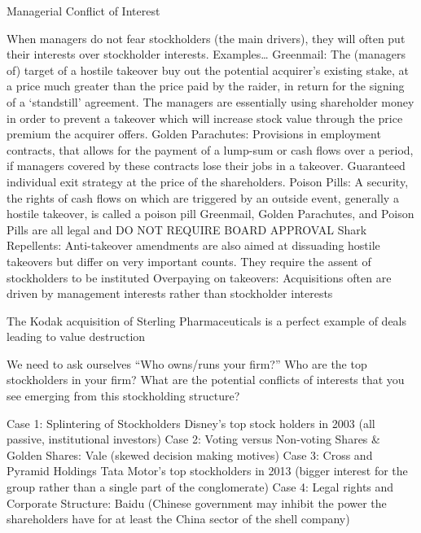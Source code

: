 \documentclass[10pt]{article}
\begin{document}
    \begin{core}{Managerial Conflict of Interest}

      When managers do not fear stockholders (the main drivers), they will often put their interests over stockholder interests. Examples…
      Greenmail: The (managers of) target of a hostile takeover buy out the potential acquirer’s existing stake, at a price much greater than the price paid by the raider, in return for the signing of a ‘standstill’ agreement. The managers are essentially using shareholder money in order to prevent a takeover which will increase stock value through the price premium the acquirer offers.
      Golden Parachutes: Provisions in employment contracts, that allows for the payment of a lump-sum or cash flows over a period, if managers covered by these contracts lose their jobs in a takeover. Guaranteed individual exit strategy at the price of the shareholders.
      Poison Pills: A security, the rights of cash flows on which are triggered by an outside event, generally a hostile takeover, is called a poison pill
      Greenmail, Golden Parachutes, and Poison Pills are all legal and DO NOT REQUIRE BOARD APPROVAL
      Shark Repellents: Anti-takeover amendments are also aimed at dissuading hostile takeovers but differ on very important counts. They require the assent of stockholders to be instituted
      Overpaying on takeovers: Acquisitions often are driven by management interests rather than stockholder interests

      The Kodak acquisition of Sterling Pharmaceuticals is a perfect example of deals leading to value destruction

      We need to ask ourselves “Who owns/runs your firm?”
      Who are the top stockholders in your firm?
      What are the potential conflicts of interests that you see emerging from this stockholding structure?


      Case 1: Splintering of Stockholders Disney’s top stock holders in 2003 (all passive, institutional investors)
      Case 2: Voting versus Non-voting Shares & Golden Shares: Vale (skewed decision making motives)
      Case 3: Cross and Pyramid Holdings Tata Motor’s top stockholders in 2013 (bigger interest for the group rather than a single part of the conglomerate)
      Case 4: Legal rights and Corporate Structure: Baidu (Chinese government may inhibit the power the shareholders have for at least the China sector of the shell company)

    \end{core}
\end{document}
